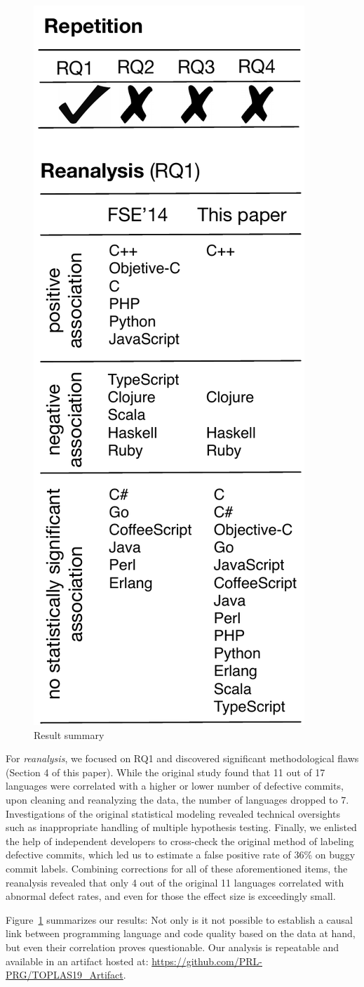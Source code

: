 \documentclass[acmsmall]{acmart}
\begin{document}
\begin{figure}\begin{center}\vspace{-3mm}
\includegraphics[width=.3\columnwidth]{Pictures/summary}\end{center}
\caption{Result summary}\label{sum}
\vspace{-5mm}
\end{figure}
\noindent  
For \emph{reanalysis}, we focused on RQ1 and discovered significant
methodological flaws (Section 4 of this paper).  While the original study
found that 11 out of 17 languages were correlated with a higher or lower
number of defective commits, upon cleaning and reanalyzing the data, the
number of languages dropped to 7. Investigations of the original statistical
modeling revealed technical oversights such as inappropriate handling of
multiple hypothesis testing. Finally, we enlisted the help of independent
developers to cross-check the original method of labeling defective commits,
which led us to estimate a false positive rate of 36\% on buggy commit
labels. Combining corrections for all of these aforementioned items, the
reanalysis revealed that only 4 out of the original 11 languages correlated
with abnormal defect rates, and even for those the effect size is
exceedingly small.

Figure~\ref{sum} summarizes our results: Not only is it not possible to
establish a causal link between programming language and code quality based
on the data at hand, but even their correlation proves questionable.  Our
analysis is repeatable and available in an artifact hosted at:
{\small\url{https://github.com/PRL-PRG/TOPLAS19_Artifact}}.
\end{document}
